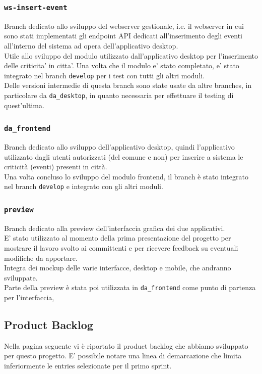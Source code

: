 \documentclass{article}
\begin{document}
\subsubsection{\texttt{ws-insert-event}}
Branch dedicato allo sviluppo del webserver gestionale, i.e. il webserver in cui sono stati implementati gli endpoint API dedicati all'inserimento degli eventi all'interno del sistema ad opera dell'applicativo desktop. \\
Utile allo sviluppo del modulo utilizzato dall'applicativo desktop per l'inserimento delle criticita' in citta'.
Una volta che il modulo e' stato completato, e' stato integrato nel branch \texttt{develop} per i test con tutti gli altri moduli.\\
Delle versioni intermedie di questa branch sono state usate da altre branches, in particolare da \texttt{da\_desktop}, in quanto necessaria per effettuare il testing di quest'ultima.


\subsubsection{\texttt{da\_frontend}}
Branch dedicato allo sviluppo dell'applicativo desktop, quindi l'applicativo utilizzato dagli utenti autorizzati (del comune e non) per inserire a sistema le criticità (eventi) presenti in città.\\
Una volta concluso lo sviluppo del modulo frontend, il branch è stato integrato nel branch \texttt{develop} e integrato con gli altri moduli.

\subsubsection{\texttt{preview}}
Branch dedicato alla preview dell'interfaccia grafica dei due applicativi.\\
E' stato utilizzato al momento della prima presentazione del progetto per mostrare il lavoro svolto ai committenti e per ricevere feedback su eventuali modifiche da apportare.\\
Integra dei mockup delle varie interfacce, desktop e mobile, che andranno sviluppate.\\
Parte della preview è stata poi utilizzata in \texttt{da\_frontend} come punto di partenza per l'interfaccia,

\clearpage

\subsection{Product Backlog}
Nella pagina seguente vi è riportato il product backlog che abbiamo sviluppato per questo progetto. E' possibile notare una linea di demarcazione che limita inferiormente le entries selezionate per il primo sprint.
\end{document}
